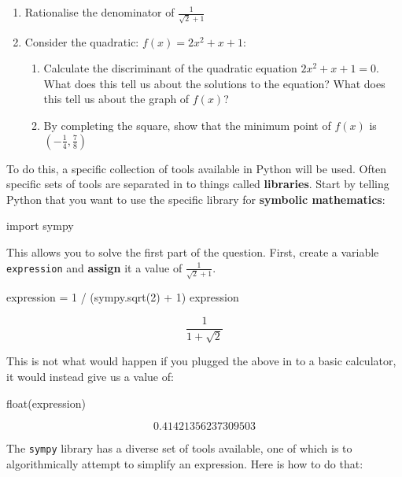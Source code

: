 \begin{enumerate}

\item 
Rationalise the denominator of \(\frac{1}{\sqrt{2} + 1}\)

\item 
Consider the quadratic: \(f(x)=2x ^ 2 + x + 1\):

\begin{enumerate}

\item Calculate the discriminant of the quadratic equation \(2x ^ 2 + x + 1 =
0\). What does this tell us about the solutions to the equation? What
does this tell us about the graph of \(f(x)\)?

\item By completing the square, show that the minimum point of \(f(x)\) is
\(\left(-\frac{1}{4}, \frac{7}{8}\right)\)

\end{enumerate}

\end{enumerate}


To do this, a specific collection of tools available in Python will be used.
Often specific sets of tools are separated in to things called \textbf{libraries}. 
Start by telling Python that you want to use the specific library for \textbf{symbolic
mathematics}:

\begin{pyin}
import sympy
\end{pyin}

This allows you to solve the first part of the question. First, create a
variable \texttt{expression} and \textbf{assign} it a value of \(\frac{1}{\sqrt{2} + 1}\).

\begin{pyin}
expression = 1 / (sympy.sqrt(2) + 1)
expression
\end{pyin}

\[\frac{1}{1 + \sqrt{2}}\]

\begin{note}
This is not what would happen if you plugged the above in to a basic calculator,
it would instead give us a value of:
\end{note}


\begin{pyin}
float(expression)
\end{pyin}

\[0.41421356237309503\]

The \texttt{sympy} library has a diverse set of tools available, one of which is to
algorithmically attempt to simplify an expression. Here is how to do that:

